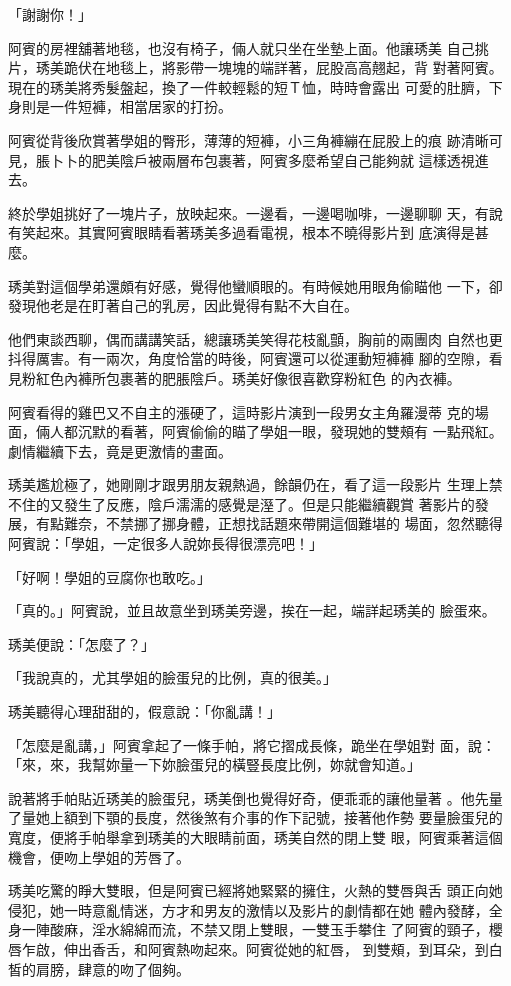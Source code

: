 「謝謝你！」

阿賓的房裡舖著地毯，也沒有椅子，倆人就只坐在坐墊上面。他讓琇美
自己挑片，琇美跪伏在地毯上，將影帶一塊塊的端詳著，屁股高高翹起，背
對著阿賓。現在的琇美將秀髮盤起，換了一件較輕鬆的短Ｔ恤，時時會露出
可愛的肚臍，下身則是一件短褲，相當居家的打扮。

阿賓從背後欣賞著學姐的臀形，薄薄的短褲，小三角褲繃在屁股上的痕
跡清晰可見，脹卜卜的肥美陰戶被兩層布包裹著，阿賓多麼希望自己能夠就
這樣透視進去。

終於學姐挑好了一塊片子，放映起來。一邊看，一邊喝咖啡，一邊聊聊
天，有說有笑起來。其實阿賓眼睛看著琇美多過看電視，根本不曉得影片到
底演得是甚麼。

琇美對這個學弟還頗有好感，覺得他蠻順眼的。有時候她用眼角偷瞄他
一下，卻發現他老是在盯著自己的乳房，因此覺得有點不大自在。

他們東談西聊，偶而講講笑話，總讓琇美笑得花枝亂顫，胸前的兩團肉
自然也更抖得厲害。有一兩次，角度恰當的時後，阿賓還可以從運動短褲褲
腳的空隙，看見粉紅色內褲所包裹著的肥脹陰戶。琇美好像很喜歡穿粉紅色
的內衣褲。

阿賓看得的雞巴又不自主的漲硬了，這時影片演到一段男女主角羅漫蒂
克的場面，倆人都沉默的看著，阿賓偷偷的瞄了學姐一眼，發現她的雙頰有
一點飛紅。劇情繼續下去，竟是更激情的畫面。

琇美尷尬極了，她剛剛才跟男朋友親熱過，餘韻仍在，看了這一段影片
生理上禁不住的又發生了反應，陰戶濡濡的感覺是溼了。但是只能繼續觀賞
著影片的發展，有點難奈，不禁挪了挪身體，正想找話題來帶開這個難堪的
場面，忽然聽得阿賓說：「學姐，一定很多人說妳長得很漂亮吧！」

「好啊！學姐的豆腐你也敢吃。」

「真的。」阿賓說，並且故意坐到琇美旁邊，挨在一起，端詳起琇美的
臉蛋來。

琇美便說：「怎麼了？」

「我說真的，尤其學姐的臉蛋兒的比例，真的很美。」

琇美聽得心理甜甜的，假意說：「你亂講！」

「怎麼是亂講，」阿賓拿起了一條手帕，將它摺成長條，跪坐在學姐對
面，說：「來，來，我幫妳量一下妳臉蛋兒的橫豎長度比例，妳就會知道。」

說著將手帕貼近琇美的臉蛋兒，琇美倒也覺得好奇，便乖乖的讓他量著
。他先量了量她上額到下顎的長度，然後煞有介事的作下記號，接著他作勢
要量臉蛋兒的寬度，便將手帕舉拿到琇美的大眼睛前面，琇美自然的閉上雙
眼，阿賓乘著這個機會，便吻上學姐的芳唇了。

琇美吃驚的睜大雙眼，但是阿賓已經將她緊緊的擁住，火熱的雙唇與舌
頭正向她侵犯，她一時意亂情迷，方才和男友的激情以及影片的劇情都在她
體內發酵，全身一陣酸麻，淫水綿綿而流，不禁又閉上雙眼，一雙玉手攀住
了阿賓的頸子，櫻唇乍啟，伸出香舌，和阿賓熱吻起來。阿賓從她的紅唇，
到雙頰，到耳朵，到白皙的肩膀，肆意的吻了個夠。

